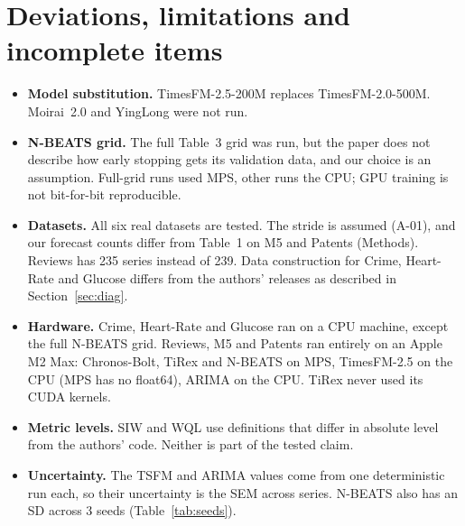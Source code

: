 \section{Deviations, limitations and incomplete items}
\label{sec:incomplete}
\begin{itemize}
\item \textbf{Model substitution.} TimesFM-2.5-200M replaces TimesFM-2.0-500M. Moirai~2.0 and YingLong were not run.
\item \textbf{N-BEATS grid.} The full Table~3 grid was run, but the paper does not describe how early stopping
gets its validation data, and our choice is an assumption. Full-grid runs used MPS, other runs the CPU; GPU
training is not bit-for-bit reproducible.
\item \textbf{Datasets.} All six real datasets are tested. The stride is assumed (A-01), and our forecast counts
differ from Table~1 on M5 and Patents (Methods). Reviews has 235 series instead of 239. Data construction for
Crime, Heart-Rate and Glucose differs from the authors' releases as described in Section~\ref{sec:diag}.
\item \textbf{Hardware.} Crime, Heart-Rate and Glucose ran on a CPU machine, except the full N-BEATS grid.
Reviews, M5 and Patents ran entirely on an Apple M2 Max: Chronos-Bolt, TiRex and N-BEATS on MPS, TimesFM-2.5 on the
CPU (MPS has no float64), ARIMA on the CPU. TiRex never used its CUDA kernels.
\item \textbf{Metric levels.} SIW and WQL use definitions that differ in absolute level from the authors' code.
Neither is part of the tested claim.
\item \textbf{Uncertainty.} The TSFM and ARIMA values come from one deterministic run each, so their uncertainty is
the SEM across series. N-BEATS also has an SD across 3 seeds (Table~\ref{tab:seeds}).
\end{itemize}

